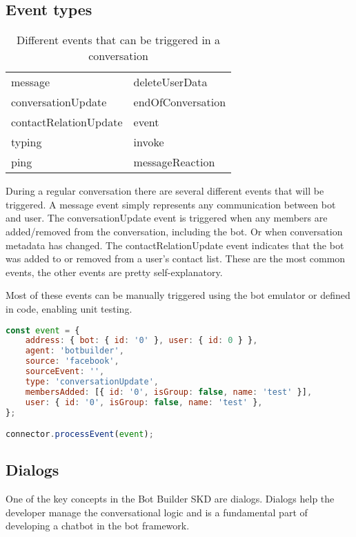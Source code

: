 \subsection{Event types}

\renewcommand{\arraystretch}{1}
\begin{table}[h]
	\centering
	\begin{tabular}{|l|l|}
		\hline
		message & deleteUserData \\
		conversationUpdate & endOfConversation \\
		contactRelationUpdate & event \\
		typing & invoke \\
		ping & messageReaction \\
		\hline
	\end{tabular}
	\caption{Different events that can be triggered in a conversation}
	\label{tab:events}
\end{table}

During a regular conversation there are several different events that will be triggered. A message event simply represents any communication between bot and user. The conversationUpdate event is triggered when any members are added/removed from the conversation, including the bot. Or when conversation metadata has changed. The contactRelationUpdate event indicates that the bot was added to or removed from a user's contact list.
These are the most common events, the other events are pretty self-explanatory.

Most of these events can be manually triggered using the bot emulator or defined in code, enabling unit testing.

\begin{lstlisting}[language=JavaScript,caption=Sending a mock event to the bot,label=listing:botframework-mock-event]
const event = {
	address: { bot: { id: '0' }, user: { id: 0 } },
	agent: 'botbuilder',
	source: 'facebook',
	sourceEvent: '',
	type: 'conversationUpdate',
	membersAdded: [{ id: '0', isGroup: false, name: 'test' }],
	user: { id: '0', isGroup: false, name: 'test' },
};

connector.processEvent(event);
\end{lstlisting}

\subsection{Dialogs}

One of the key concepts in the Bot Builder SKD are dialogs. Dialogs help the developer manage the conversational logic and is a fundamental part of developing a chatbot in the bot framework.

